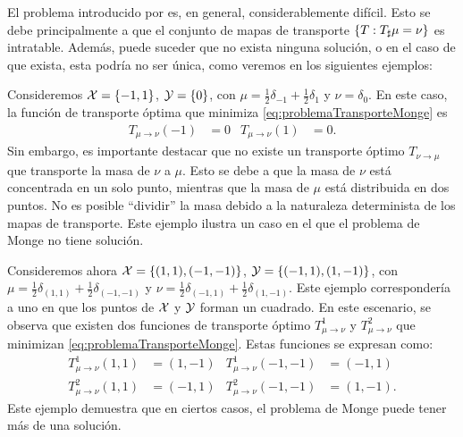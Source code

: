 {{	  El problema introducido por \cite{monge1781memoire} es, en general, considerablemente difícil. Esto se debe principalmente a que el conjunto de mapas de transporte $\left\{ T : {T}_{\sharp} \mu = \nu \right\}$ es intratable. Además, puede suceder que no exista ninguna solución, o en el caso de que exista, esta podría no ser única, como veremos en los siguientes ejemplos:

	  \begin{example}\label{ex:problemaDeMongeSinSolucion}
		  Consideremos $\mathcal{X} = \left\{ -1, 1 \right\}$, $\mathcal{Y} = \left\{ 0 \right\}$, con $\mu = \frac{1}{2} \delta_{-1} + \frac{1}{2} \delta_{1}$ y $\nu = \delta_0$. En este caso, la función de transporte óptima que minimiza \eqref{eq:problemaTransporteMonge} es
		  \begin{align*}
			  T_{\mu \to \nu}(-1) & = 0 & T_{\mu \to \nu}(1) & = 0.
		  \end{align*}
		  Sin embargo, es importante destacar que no existe un transporte óptimo $T_{\nu \to \mu}$ que transporte la masa de $\nu$ a $\mu$. Esto se debe a que la masa de $\nu$ está concentrada en un solo punto, mientras que la masa de $\mu$ está distribuida en dos puntos. No es posible ``dividir'' la masa debido a la naturaleza determinista de los mapas de transporte. Este ejemplo ilustra un caso en el que el problema de Monge no tiene solución.
	  \end{example}

	  \begin{example}\label{ex:problemaDeMongeMultipleSolucion}
		  Consideremos ahora $\mathcal{X} = \left\{ (1, 1), (-1, -1) \right\}$, $\mathcal{Y} = \left\{ (-1, 1), (1, -1) \right\}$, con $\mu = \frac{1}{2} \delta_{(1, 1)} + \frac{1}{2} \delta_{(-1, -1)}$ y $\nu = \frac{1}{2} \delta_{(-1, 1)} + \frac{1}{2} \delta_{(1, -1)}$. Este ejemplo correspondería a uno en que los puntos de $\mathcal{X}$ y $\mathcal{Y}$ forman un cuadrado. En este escenario, se observa que existen dos funciones de transporte óptimo $T^1_{\mu\to\nu}$ y $T^2_{\mu\to\nu}$ que minimizan \eqref{eq:problemaTransporteMonge}. Estas funciones se expresan como:
		  \begin{align*}
			  T^1_{\mu\to\nu}(1, 1) & = (1, -1) & T^1_{\mu\to\nu}(-1, -1) & = (-1, 1)  \\
			  T^2_{\mu\to\nu}(1, 1) & = (-1, 1) & T^2_{\mu\to\nu}(-1, -1) & = (1, -1).
		  \end{align*}
		  Este ejemplo demuestra que en ciertos casos, el problema de Monge puede tener más de una solución.
	  \end{example}



}}
